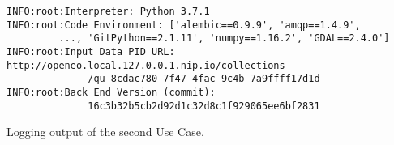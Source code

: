 \documentclass[draft,final]{vutinfth} %
\newenvironment{code}{\captionsetup{type=listing}}{}
\begin{document}
\begin{code}
	\begin{verbatim}
INFO:root:Interpreter: Python 3.7.1
INFO:root:Code Environment: ['alembic==0.9.9', 'amqp==1.4.9',
         ..., 'GitPython==2.1.11', 'numpy==1.16.2', 'GDAL==2.4.0']
INFO:root:Input Data PID URL:
http://openeo.local.127.0.0.1.nip.io/collections
              /qu-8cdac780-7f47-4fac-9c4b-7a9ffff17d1d
INFO:root:Back End Version (commit): 
              16c3b32b5cb2d92d1c32d8c1f929065ee6bf2831
	\end{verbatim}
	\caption{Logging output of the second Use Case.}
	\label{lst:use_case2_logfile}
\end{code}
\end{document}
